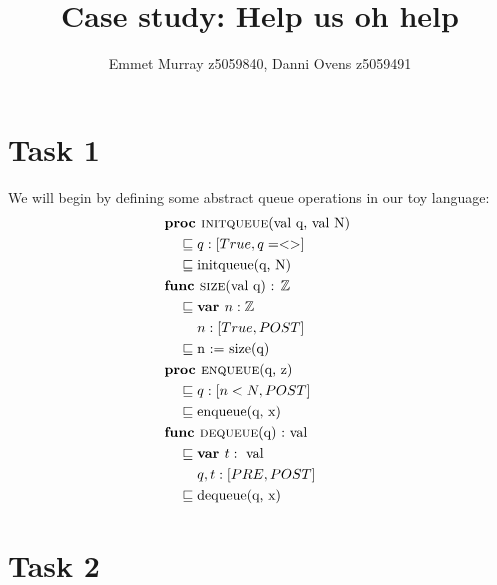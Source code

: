 \documentclass[a4paper]{scrartcl}
\title{Case study: Help us oh help}
\author{Emmet Murray z5059840, Danni Ovens z5059491}
\newcommand{\Z}{\mathbb{Z}}
\newcommand{\refinedby}{\sqsubseteq} %
\begin{document}
\maketitle
\section*{Task 1}
We will begin by defining some abstract queue operations in our toy language:
\begin{align*}
& \textbf{proc }\text{\textsc{initqueue}(val q, val N) } \\ 
    &\quad \refinedby  q : [True, q = <> ] \\
    & \quad \refinedby \text{initqueue(q, N)} \\
& \textbf{func }\text{\textsc{size}(val q) : }\Z \\
    & \quad \refinedby \textbf{var }n : \Z \\
    & \quad \quad ~ n : [True, POST] \\
    & \quad \refinedby \text{n := size(q)} \\
& \textbf{proc }\text{\textsc{enqueue}(q, z) }\\
    & \quad \refinedby q : [n < N,  POST] \\
    & \quad \refinedby \text{enqueue(q, x)} \\
& \textbf{func }\text{\textsc{dequeue}(q) :} \text{ val}\\
    & \quad \refinedby \textbf{var }t : \text{ val} \\
    & \quad \quad ~ q, t : [PRE,  POST] \\
    & \quad \refinedby \text{dequeue(q, x)} \\
\end{align*}

\section*{Task 2}
\end{document}
